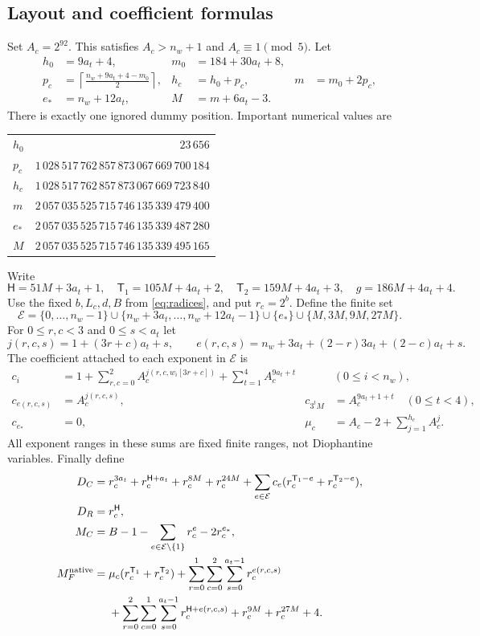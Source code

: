 \documentclass[11pt,a4paper]{article}
\theoremstyle{remark}
\newcommand{\mc}{M_C}
\begin{document}
\subsection{Layout and coefficient formulas}

Set $A_c=2^{92}$. This satisfies $A_c>n_w+1$ and $A_c\equiv1\pmod5$.
Let
\begin{align*}
 h_0&=9a_t+4, & m_0&=184+30a_t+8,\\
 p_c&=\left\lceil\frac{n_w+9a_t+4-m_0}{2}\right\rceil,&
 h_c&=h_0+p_c,& m&=m_0+2p_c,\\
 e_*&=n_w+12a_t,& M&=m+6a_t-3.
\end{align*}
There is exactly one ignored dummy position. Important numerical
values are
\begin{center}\small
\begin{tabular}{lr}
\toprule
$h_0$ & $23\,656$\\
$p_c$ & $1\,028\,517\,762\,857\,873\,067\,669\,700\,184$\\
$h_c$ & $1\,028\,517\,762\,857\,873\,067\,669\,723\,840$\\
$m$ & $2\,057\,035\,525\,715\,746\,135\,339\,479\,400$\\
$e_*$ & $2\,057\,035\,525\,715\,746\,135\,339\,487\,280$\\
$M$ & $2\,057\,035\,525\,715\,746\,135\,339\,495\,165$\\
\bottomrule
\end{tabular}
\end{center}
Write
\[
 \mathsf H=51M+3a_t+1,\quad
 \mathsf T_1=105M+4a_t+2,\quad
 \mathsf T_2=159M+4a_t+3,\quad g=186M+4a_t+4.
\]
Use the fixed $b,L_c,d,B$ from \eqref{eq:radices}, and put $r_c=2^b$.
Define the finite set
\[
 \mathcal E=\{0,\ldots,n_w-1\}\cup
 \{n_w+3a_t,\ldots,n_w+12a_t-1\}\cup
 \{e_*\}\cup\{M,3M,9M,27M\}.
\]
For $0\le r,c<3$ and $0\le s<a_t$ let
\[
 j(r,c,s)=1+(3r+c)a_t+s,\qquad
 e(r,c,s)=n_w+3a_t+(2-r)3a_t+(2-c)a_t+s.
\]
The coefficient attached to each exponent in $\mathcal E$ is
\begin{align*}
 c_i&=1+\sum_{r,c=0}^{2}A_c^{j(r,c,w_i[3r+c])}
          +\sum_{t=1}^{4}A_c^{9a_t+t} &&(0\le i<n_w),\\
 c_{e(r,c,s)}&=A_c^{j(r,c,s)},&
 c_{3^tM}&=A_c^{9a_t+1+t}\quad(0\le t<4),\\
 c_{e_*}&=0,&
 \mu_c&=A_c-2+\sum_{j=1}^{h_c}A_c^j.
\end{align*}
All exponent ranges in these sums are fixed finite ranges, not
Diophantine variables. Finally define
\begin{align}
 D_C={}&r_c^{3a_t}+r_c^{\mathsf H+a_t}+r_c^{8M}+r_c^{24M}
       +\sum_{e\in\mathcal E}c_e
           (r_c^{\mathsf T_1-e}+r_c^{\mathsf T_2-e}),\label{eq:DC}\\
 D_R={}&r_c^{\mathsf H},\label{eq:DR}\\
 \mc={}&B-1-\sum_{e\in\mathcal E\setminus\{1\}}r_c^e-2r_c^{e_*},
 \label{eq:MC}\\
 M_F^{\mathrm{native}}={}&\mu_c(r_c^{\mathsf T_1}+r_c^{\mathsf T_2})
       +\sum_{r=0}^{1}\sum_{c=0}^{2}\sum_{s=0}^{a_t-1}r_c^{e(r,c,s)}
       \notag\\
 &+\sum_{r=0}^{2}\sum_{c=0}^{1}\sum_{s=0}^{a_t-1}r_c^{\mathsf H+e(r,c,s)}
       +r_c^{9M}+r_c^{27M}+4.\label{eq:MF}
\end{align}
\end{document}
